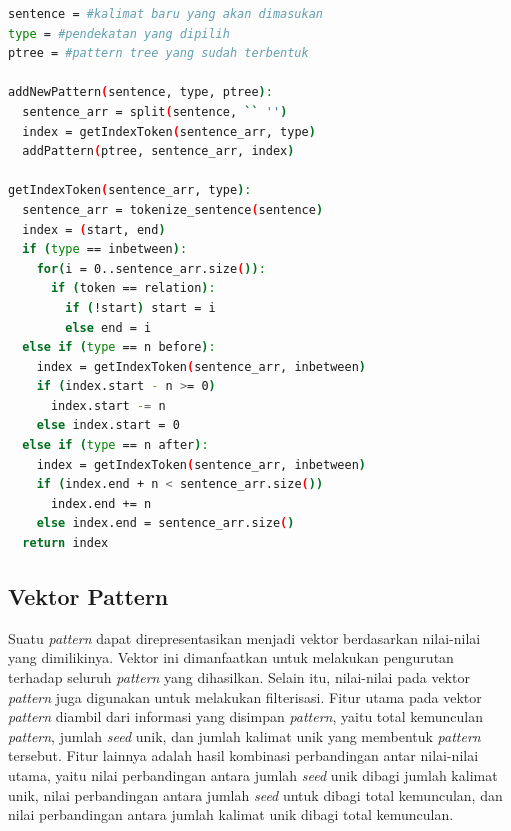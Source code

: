 \begin{lstlisting}[caption={Penambahan \textit{pattern} ke dalam \textit{pattern tree}}, language=bash, label={code:pembentukan-ptree}]
sentence = #kalimat baru yang akan dimasukan
type = #pendekatan yang dipilih
ptree = #pattern tree yang sudah terbentuk

addNewPattern(sentence, type, ptree):
  sentence_arr = split(sentence, `` '')
  index = getIndexToken(sentence_arr, type)
  addPattern(ptree, sentence_arr, index)

getIndexToken(sentence_arr, type):
  sentence_arr = tokenize_sentence(sentence)
  index = (start, end)
  if (type == inbetween):
    for(i = 0..sentence_arr.size()):
      if (token == relation):
        if (!start) start = i
        else end = i
  else if (type == n before):
    index = getIndexToken(sentence_arr, inbetween)
    if (index.start - n >= 0)
      index.start -= n
    else index.start = 0
  else if (type == n after):
    index = getIndexToken(sentence_arr, inbetween)
    if (index.end + n < sentence_arr.size())
      index.end += n
    else index.end = sentence_arr.size()
  return index
\end{lstlisting}

\subsection{Vektor Pattern}
Suatu \textit{pattern} dapat direpresentasikan menjadi vektor berdasarkan nilai-nilai yang dimilikinya. Vektor ini dimanfaatkan untuk melakukan pengurutan terhadap seluruh \textit{pattern} yang dihasilkan. Selain itu, nilai-nilai pada vektor \textit{pattern} juga digunakan untuk melakukan filterisasi. Fitur utama pada vektor \textit{pattern} diambil dari informasi yang disimpan \textit{pattern}, yaitu total kemunculan \textit{pattern}, jumlah \textit{seed} unik, dan jumlah kalimat unik yang membentuk \textit{pattern} tersebut. Fitur lainnya adalah hasil kombinasi perbandingan antar nilai-nilai utama, yaitu nilai perbandingan antara jumlah \textit{seed} unik dibagi jumlah kalimat unik, nilai perbandingan antara jumlah \textit{seed} untuk dibagi total kemunculan, dan nilai perbandingan antara jumlah kalimat unik dibagi total kemunculan.

